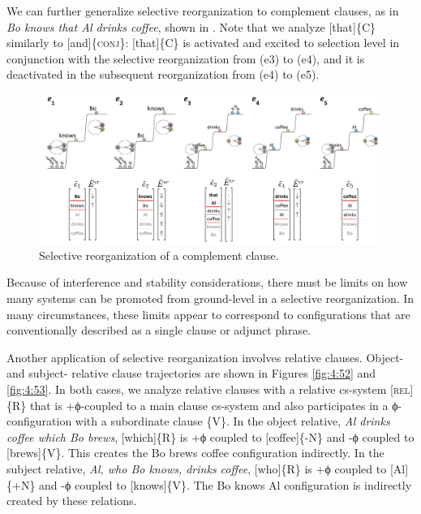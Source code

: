   We can further generalize selective reorganization to complement clauses, as in \textit{Bo knows that Al drinks coffee}, shown in {}. Note that we analyze [that]\{C\} similarly to [and]\{\textsc{conj}\}: [that]\{C\} is activated and excited to selection level in conjunction with the selective reorganization from (e3) to (e4), and it is deactivated in the subsequent reorganization from (e4) to (e5). 

  
\begin{figure}
\includegraphics[width=\textwidth]{figures/Tilsen-img101.png}
\caption{Selective reorganization of a complement clause.}
\label{fig:4:51}
\end{figure}
 

  Because of interference and stability considerations, there must be limits on how many systems can be promoted from ground-level in a selective reorganization. In many circumstances, these limits appear to correspond to configurations that are conventionally described as a single clause or adjunct phrase.

  Another application of selective reorganization involves relative clauses. Object- and subject- relative clause trajectories are shown in Figures {\ref{fig:4:52}} and {\ref{fig:4:53}}. In both cases, we analyze relative clauses with a relative cs-system [\textsc{rel}]\{R\} that is +ϕ-coupled to a main clause cs-system and also participates in a ϕ-configuration with a subordinate clause \{V\}. In the object relative, \textit{Al drinks coffee which Bo brews}, [which]\{R\} is +ϕ coupled to [coffee]\{-N\} and -ϕ coupled to [brews]\{V\}. This creates the {\textbar}Bo brews coffee{\textbar} configuration indirectly. In the subject relative, \textit{Al, who Bo knows, drinks coffee}, [who]\{R\} is +ϕ coupled to [Al]\{+N\} and -ϕ coupled to [knows]\{V\}. The {\textbar}Bo knows Al{\textbar} configuration is indirectly created by these relations.


